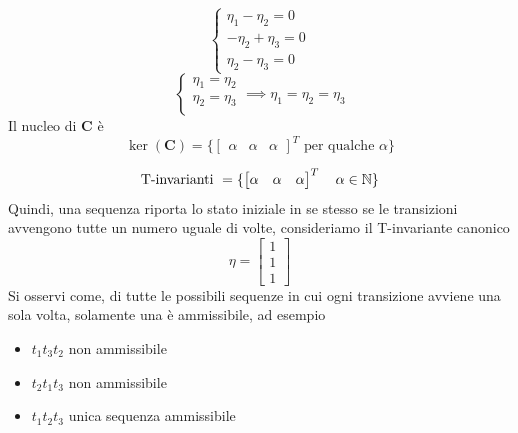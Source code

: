 \documentclass[10pt, letterpaper]{report}
\begin{document}
  $$ \begin{cases}
    \eta_1-\eta_2=0\\ 
    -\eta_2+\eta_3=0\\ 
    \eta_2-\eta_3=0
  \end{cases}$$
  $$ \begin{cases}
    \eta_1=\eta_2\\ 
    \eta_2=\eta_3\\ 
  \end{cases}\implies \eta_1=\eta_2=\eta_3$$
Il nucleo di $\mathbf C$ è 
$$ \ker(\mathbf C)=\{\begin{bmatrix} \alpha&\alpha&\alpha\end{bmatrix}^T \text{ per qualche }\alpha\}$$

$$ \text{T-invarianti }=\{\begin{bmatrix} \alpha&\alpha&\alpha\end{bmatrix}^T  \ \ \ \alpha\in {\mathbb N}\}$$
Quindi, una sequenza riporta lo stato iniziale in se stesso se le transizioni avvengono tutte un numero uguale di volte, consideriamo il T-invariante canonico 
$$ \eta=\begin{bmatrix}
    1\\1\\1
\end{bmatrix}$$
Si osservi come, di tutte le possibili sequenze in cui ogni transizione avviene una sola volta, solamente una è ammissibile, ad esempio 
\begin{itemize}
    \item $t_1t_3t_2 $ non ammissibile 
    \item $t_2t_1t_3 $ non ammissibile 
    \item $t_1t_2t_3 $ unica sequenza ammissibile 
\end{itemize}
\flowerLine 
\end{document}
